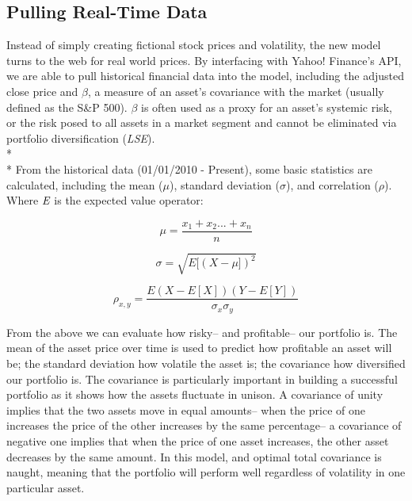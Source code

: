 \documentclass[12pt]{article}
\begin{document}
\subsection{Pulling Real-Time Data}
Instead of simply creating fictional stock prices and volatility, the new model turns to the web for real world prices. By interfacing with Yahoo! Finance's API, we are able to pull historical financial data into the model, including the adjusted close price and ${\beta}$, a measure of an asset's covariance with the market (usually defined as the S\&P 500). ${\beta}$ is often used as a proxy for an asset's systemic risk, or the risk posed to all assets in a market segment and cannot be eliminated via portfolio diversification (\emph{LSE}). \\*\\*
From the historical data (01/01/2010 - Present), some basic statistics are calculated, including the mean (${\mu}$), standard deviation (${\sigma}$), and correlation (${\rho}$). Where ${\emph E}$ is the expected value operator:


\begin{equation}
	\mu = \frac{x_{1} + x_{2} ... + x_{n}} {n}
\end{equation}	

\begin{equation}
	\sigma = \sqrt{E[(X - \mu])^{2}}
\end{equation}	
	
\begin{equation}
	\rho_{x,y} = \frac{E(X - E[X])(Y-E[Y])}{\sigma_{x}\sigma_{y}}
\end{equation}

From the above we can evaluate how risky-- and profitable-- our portfolio is. The mean of the asset price over time is used to predict how profitable an asset will be; the standard deviation how volatile the asset is; the covariance how diversified our portfolio is. The covariance is particularly important in building a successful portfolio as it shows how the assets fluctuate in unison. A covariance of unity implies that the two assets move in equal amounts-- when the price of one increases the price of the other increases by the same percentage-- a covariance of negative one implies that when the price of one asset increases, the other asset decreases by the same amount. In this model, and optimal total covariance is naught, meaning that the portfolio will perform well regardless of volatility in one particular asset.
\end{document}
